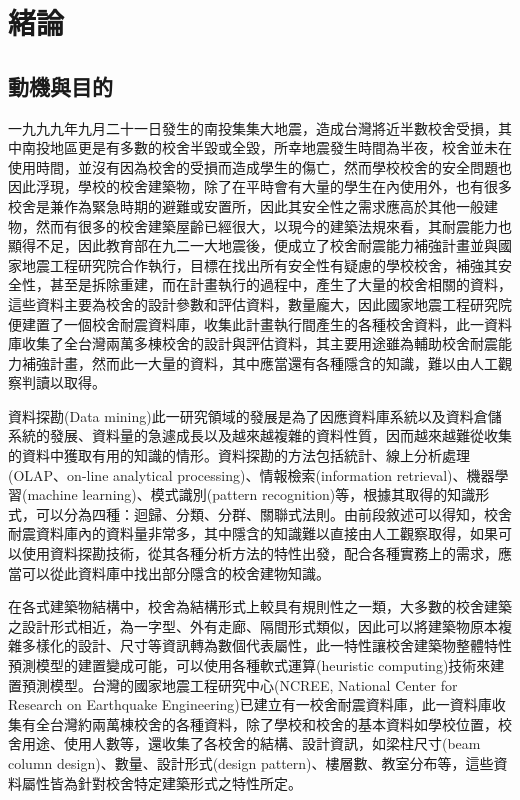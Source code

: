 % 
\chapter{緒論}
\label{cha:intro} 

\section{動機與目的}

一九九九年九月二十一日發生的南投集集大地震，造成台灣將近半數校舍受損，其中南投地區更是有多數的校舍半毀或全毀，所幸地震發生時間為半夜，校舍並未在使用時間，並沒有因為校舍的受損而造成學生的傷亡，然而學校校舍的安全問題也因此浮現，學校的校舍建築物，除了在平時會有大量的學生在內使用外，也有很多校舍是兼作為緊急時期的避難或安置所，因此其安全性之需求應高於其他一般建物，然而有很多的校舍建築屋齡已經很大，以現今的建築法規來看，其耐震能力也顯得不足，因此教育部在九二一大地震後，便成立了校舍耐震能力補強計畫並與國家地震工程研究院合作執行，目標在找出所有安全性有疑慮的學校校舍，補強其安全性，甚至是拆除重建，而在計畫執行的過程中，產生了大量的校舍相關的資料，這些資料主要為校舍的設計參數和評估資料，數量龐大，因此國家地震工程研究院便建置了一個校舍耐震資料庫，收集此計畫執行間產生的各種校舍資料，此一資料庫收集了全台灣兩萬多棟校舍的設計與評估資料，其主要用途雖為輔助校舍耐震能力補強計畫，然而此一大量的資料，其中應當還有各種隱含的知識，難以由人工觀察判讀以取得。

資料探勘(Data mining)此一研究領域的發展是為了因應資料庫系統以及資料倉儲系統的發展、資料量的急遽成長以及越來越複雜的資料性質，因而越來越難從收集的資料中獲取有用的知識的情形。資料探勘的方法包括統計、線上分析處理(OLAP、on-line analytical processing)、情報檢索(information retrieval)、機器學習(machine learning)、模式識別(pattern recognition)等，根據其取得的知識形式，可以分為四種：迴歸、分類、分群、關聯式法則。由前段敘述可以得知，校舍耐震資料庫內的資料量非常多，其中隱含的知識難以直接由人工觀察取得，如果可以使用資料探勘技術，從其各種分析方法的特性出發，配合各種實務上的需求，應當可以從此資料庫中找出部分隱含的校舍建物知識。

在各式建築物結構中，校舍為結構形式上較具有規則性之一類，大多數的校舍建築之設計形式相近，為一字型、外有走廊、隔間形式類似，因此可以將建築物原本複雜多樣化的設計、尺寸等資訊轉為數個代表屬性，此一特性讓校舍建築物整體特性預測模型的建置變成可能，可以使用各種軟式運算(heuristic computing)技術來建置預測模型。台灣的國家地震工程研究中心(NCREE, National Center for Research on Earthquake Engineering)已建立有一校舍耐震資料庫，此一資料庫收集有全台灣約兩萬棟校舍的各種資料，除了學校和校舍的基本資料如學校位置，校舍用途、使用人數等，還收集了各校舍的結構、設計資訊，如梁柱尺寸(beam column design)、數量、設計形式(design pattern)、樓層數、教室分布等，這些資料屬性皆為針對校舍特定建築形式之特性所定。

